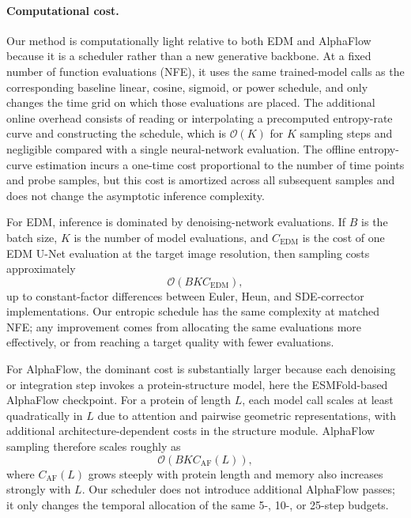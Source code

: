 \documentclass{article}
\theoremstyle{plain}
\theoremstyle{definition}
\theoremstyle{remark}
\begin{document}
\paragraph{Computational cost.} Our method is computationally light relative to both EDM and AlphaFlow because it is a scheduler rather than a new generative backbone. At a fixed number of function evaluations (NFE), it uses the same trained-model calls as the corresponding baseline linear, cosine, sigmoid, or power schedule, and only changes the time grid on which those evaluations are placed. The additional online overhead consists of reading or interpolating a precomputed entropy-rate curve and constructing the schedule, which is $\mathcal{O}(K)$ for $K$ sampling steps and negligible compared with a single neural-network evaluation. The offline entropy-curve estimation incurs a one-time cost proportional to the number of time points and probe samples, but this cost is amortized across all subsequent samples and does not change the asymptotic inference complexity.

For EDM, inference is dominated by denoising-network evaluations. If $B$ is the batch size, $K$ is the number of model evaluations, and $C_{\mathrm{EDM}}$ is the cost of one EDM U-Net evaluation at the target image resolution, then sampling costs approximately
\[
\mathcal{O}(B K C_{\mathrm{EDM}}),
\]
up to constant-factor differences between Euler, Heun, and SDE-corrector implementations. Our entropic schedule has the same complexity at matched NFE; any improvement comes from allocating the same evaluations more effectively, or from reaching a target quality with fewer evaluations.

For AlphaFlow, the dominant cost is substantially larger because each denoising or integration step invokes a protein-structure model, here the ESMFold-based AlphaFlow checkpoint. For a protein of length $L$, each model call scales at least quadratically in $L$ due to attention and pairwise geometric representations, with additional architecture-dependent costs in the structure module. AlphaFlow sampling therefore scales roughly as
\[
\mathcal{O}(B K C_{\mathrm{AF}}(L)),
\]
where $C_{\mathrm{AF}}(L)$ grows steeply with protein length and memory also increases strongly with $L$. Our scheduler does not introduce additional AlphaFlow passes; it only changes the temporal allocation of the same 5-, 10-, or 25-step budgets.


% 
\end{document}
